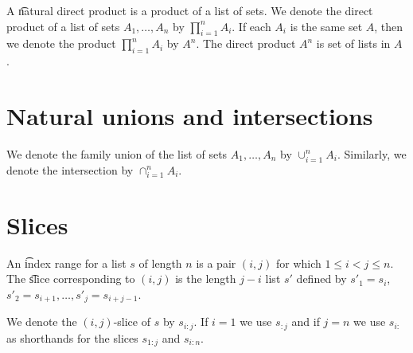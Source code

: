 A \t{natural direct product} is a product of a list of sets.
We denote the direct product of a list of sets $A_1, \dots , A_n$ by $\prod_{i = 1}^{n} A_i$.
If each $A_i$ is the same set $A$, then we denote the product $\prod_{i = 1}^{n} A_i$ by $A^n$.
The direct product $A^n$ is set of lists in $A$ .

\section*{Natural unions and intersections}

We denote the family union of the list of sets $A_1, \dots , A_n$ by $\cup_{i = 1}^{n} A_i$.
Similarly, we denote the intersection by $\cap _{i = 1}^{n} A_i$.
\section*{Slices}

An \t{index range} for a list $s$ of length $n$ is a pair $(i, j)$ for which $1 \leq i < j \leq n$.
The \t{slice} corresponding to $(i,j)$ is the length $j-i$ list $s'$ defined by $s'_1 = s_{i}$, $s'_2 = s_{i+1}, \dots, s'_{j} = s_{i + j-1}$.

We denote the $(i,j)$-slice of $s$ by $s_{i:j}$.
If $i = 1$ we use $s_{:j}$ and if $j = n$ we use $s_{i:}$ as shorthands for the slices $s_{1:j}$ and $s_{i:n}$.
